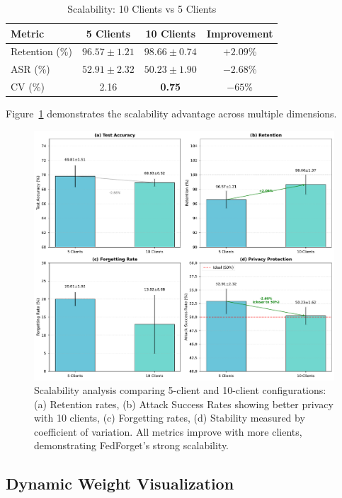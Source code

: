 \documentclass[10pt,twocolumn]{article}
\begin{document}
\begin{table}[t]
\centering
\caption{Scalability: 10 Clients vs 5 Clients}
\label{tab:scalability}
\begin{tabular}{lccc}
\toprule
Metric & 5 Clients & 10 Clients & Improvement \\
\midrule
Retention (\%) & $96.57 \pm 1.21$ & $\mathbf{98.66 \pm 0.74}$ & $+2.09$\% \\
ASR (\%) & $52.91 \pm 2.32$ & $\mathbf{50.23 \pm 1.90}$ & $-2.68$\% \\
CV (\%) & 2.16 & \textbf{0.75} & $-65$\% \\
\bottomrule
\end{tabular}
\end{table}

Figure~\ref{fig:scalability} demonstrates the scalability advantage across multiple dimensions.

\begin{figure}[htbp]
\centering
\includegraphics[width=\columnwidth]{figures/figure3_scalability.pdf}
\caption{Scalability analysis comparing 5-client and 10-client configurations: (a) Retention rates, (b) Attack Success Rates showing better privacy with 10 clients, (c) Forgetting rates, (d) Stability measured by coefficient of variation. All metrics improve with more clients, demonstrating FedForget's strong scalability.}
\label{fig:scalability}
\end{figure}

\subsection{Dynamic Weight Visualization}
\end{document}
